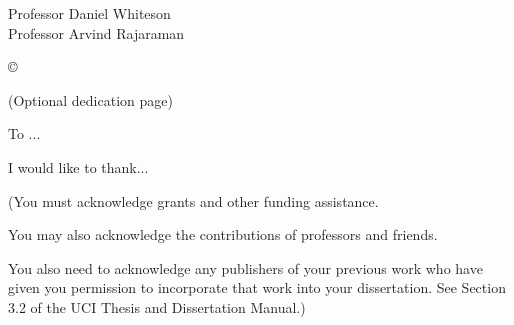 





\othercommitteemembers
{
  Professor Daniel Whiteson\\
  Professor Arvind Rajaraman
}


\copyrightdeclaration
{
  {\copyright} {\Degreeyear} \Authorname
}


\dedications
{
  (Optional dedication page)
  
  To ...
}

\acknowledgments
{
  I would like to thank...
  
  (You must acknowledge grants and other funding assistance. 
  
  You may also acknowledge the contributions of professors and
  friends.
  
  You also need to acknowledge any publishers of your previous
  work who have given you permission to incorporate that work
  into your dissertation. See Section 3.2 of the UCI Thesis and
  Dissertation Manual.)
}


